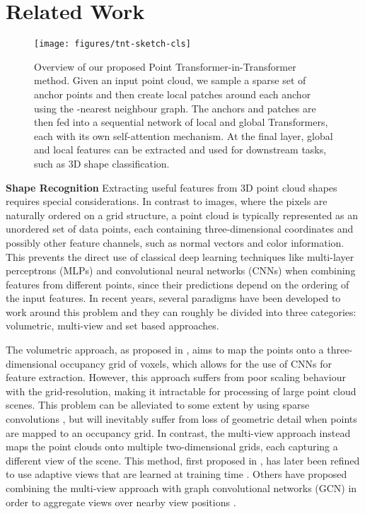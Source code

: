 \documentclass[a4paper,conference]{IEEEtran}
\begin{document}
\section{Related Work}


\begin{figure*}
\centering
\texttt{[image: figures/tnt-sketch-cls]}
\caption{Overview of our proposed Point Transformer-in-Transformer method. Given an input point cloud, we sample a sparse set of anchor points and then create local patches around each anchor using the -nearest neighbour graph. The anchors and patches are then fed into a sequential network of local and global Transformers, each with its own self-attention mechanism. At the final layer, global and local features can be extracted and used for downstream tasks, such as 3D shape classification.}
\label{overview}
\end{figure*}

\noindent \textbf{Shape Recognition} Extracting useful features from 3D point cloud shapes requires special considerations. In contrast to images, where the pixels are naturally ordered on a grid structure, a point cloud is typically represented as an unordered set of data points, each containing three-dimensional coordinates and possibly other feature channels, such as normal vectors and color information. This prevents the direct use of classical deep learning techniques like multi-layer perceptrons (MLPs) and convolutional neural networks (CNNs) when combining features from different points, since their predictions depend on the ordering of the input features. In recent years, several paradigms have been developed to work around this problem and they can roughly be divided into three categories: volumetric, multi-view and set based approaches.

The volumetric approach, as proposed in \cite{wu20153d, maturana2015voxnet}, aims to map the points onto a three-dimensional occupancy grid of voxels, which allows for the use of CNNs for feature extraction. However, this approach suffers from poor scaling behaviour with the grid-resolution, making it intractable for processing of large point cloud scenes. This problem can be alleviated to some extent by using sparse convolutions \cite{choy20194d}, but will inevitably suffer from loss of geometric detail when points are mapped to an occupancy grid. In contrast, the multi-view approach instead maps the point clouds onto multiple two-dimensional grids, each capturing a different view of the scene. This method, first proposed in \cite{su2015multi}, has later been refined to use adaptive views that are learned at training time \cite{hamdi2021mvtn}. Others have proposed combining the multi-view approach with graph convolutional networks (GCN) in order to aggregate views over nearby view positions \cite{wei2020view}.
\end{document}
